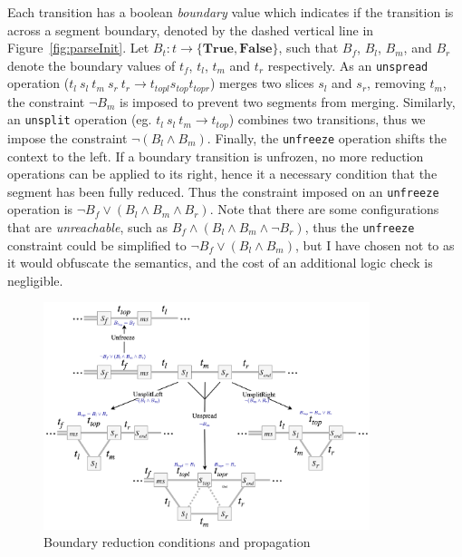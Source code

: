 \documentclass[12pt,a4paper,twoside,openright]{report} \usepackage[pdfborder={0 0 0}]{hyperref}    %
\theoremstyle{definition} \newtheorem{definition}{Definition}[section]
\begin{document}
  Each transition has a boolean \textit{boundary} value which indicates if the transition is across a segment boundary,
  denoted by the dashed vertical line in Figure~\ref{fig:parseInit}. Let $B_t : t \to \{\textbf{True},
  \textbf{False}\}$, such that $B_f$, $B_l$, $B_m$, and $B_r$ denote the boundary values of $t_f$, $t_l$, $t_m$ and
  $t_r$ respectively. As an \texttt{unspread} operation ($t_l~s_l~t_m~s_r~t_r \to t_{topl} s_{top} t_{topr} $) merges
  two slices $s_l$ and $s_r$, removing $t_m$, the constraint $\lnot B_m$ is imposed to prevent two segments from
  merging. Similarly, an \texttt{unsplit} operation (eg. $t_l~s_l~t_m \to t_{top}$) combines two transitions, thus we
  impose the constraint $\lnot (B_l \wedge B_m)$. Finally, the \texttt{unfreeze} operation shifts the context to the
  left. If a boundary transition is unfrozen, no more reduction operations can be applied to its right, hence it
  a necessary condition that the segment has been fully reduced. Thus the constraint imposed on an \texttt{unfreeze}
  operation is $\lnot B_f \vee (B_l \wedge B_m \wedge B_r)$. Note that there are some configurations that are
  \textit{unreachable}, such as $B_f \wedge (B_l \wedge B_m \wedge \lnot B_r)$, thus the \texttt{unfreeze} constraint
  could be simplified to $\lnot B_f \vee (B_l \wedge B_m)$, but I have chosen not to as it would obfuscate the
  semantics, and the cost of an additional logic check is negligible. 

  \begin{figure}[h] \centering \includegraphics[width=0.85\textwidth]{impl/boundarydiagram/diag.png} \caption{Boundary
  reduction conditions and propagation} \label{fig:parseStateOptions} \end{figure}
\end{document}
